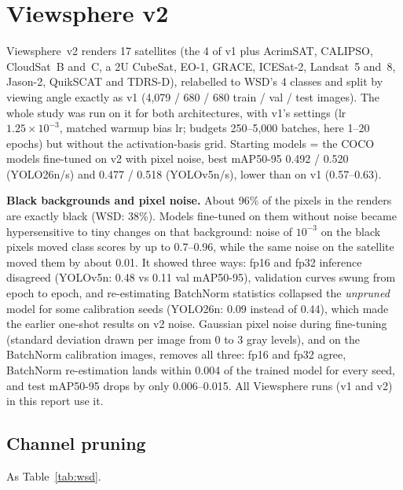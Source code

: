\documentclass[10pt]{article}
\newcommand{\tnote}[1]{\par\vspace{3pt}\begin{minipage}{\linewidth}\footnotesize #1\end{minipage}}  %
\newcommand{\tbl}[1]{\adjustbox{max width=\linewidth}{}}
\begin{document}
\section{Viewsphere v2}
\label{sec:vs2}

Viewsphere~v2 renders 17 satellites (the 4 of v1 plus AcrimSAT, CALIPSO, CloudSat~B and~C, a 2U
CubeSat, EO-1, GRACE, ICESat-2, Landsat~5 and~8, Jason-2, QuikSCAT and TDRS-D), relabelled to WSD's
4 classes and split by viewing angle exactly as v1 (4,079 / 680 / 680 train / val / test images).
The whole study was run on it for both architectures, with v1's settings (lr $1.25\times10^{-3}$,
matched warmup bias lr; budgets 250--5,000 batches, here 1--20 epochs) but without the
activation-basis grid. Starting models = the COCO models fine-tuned on v2 with pixel noise, best
mAP50-95 0.492 / 0.520 (YOLO26n/s) and 0.477 / 0.518 (YOLOv5n/s), lower than on v1 (0.57--0.63).

\textbf{Black backgrounds and pixel noise.} About 96\% of the pixels in the renders are exactly black
(WSD: 38\%). Models fine-tuned on them without noise became hypersensitive to tiny changes on that
background: noise of $10^{-3}$ on the black pixels moved class scores by up to 0.7--0.96, while the same
noise on the satellite moved them by about 0.01. It showed three ways: fp16 and fp32 inference
disagreed (YOLOv5n: 0.48 vs 0.11 val mAP50-95), validation curves swung from epoch to epoch, and
re-estimating BatchNorm statistics collapsed the \emph{unpruned} model for some calibration seeds
(YOLO26n: 0.09 instead of 0.44), which made the earlier one-shot results on v2 noise. Gaussian pixel
noise during fine-tuning (standard deviation drawn per image from 0 to 3 gray levels), and on the
BatchNorm calibration images, removes all three: fp16 and fp32 agree, BatchNorm re-estimation lands
within 0.004 of the trained model for every seed, and test mAP50-95 drops by only 0.006--0.015. All
Viewsphere runs (v1 and v2) in this report use it.

\subsection{Channel pruning}

\begin{table}[H]
\centering\small
\caption{Viewsphere v2, YOLO26: channel pruning by criterion}
\label{tab:vs2}
\tbl{viewsphere2_channel_vs2}
\tnote{As Table~\ref{tab:wsd}.}
\end{table}
\end{document}
